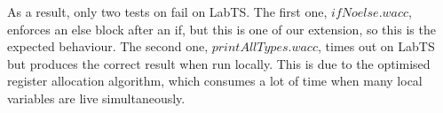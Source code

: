 \documentclass{article}
\begin{document}
As a result, only two tests on fail on LabTS. The first one, $ifNoelse.wacc$, enforces an else block after an if, but this
is one of our extension, so this is the expected behaviour. The second one, $printAllTypes.wacc$, times out on LabTS but
produces the correct result when run locally. This is due to the optimised register allocation algorithm, which consumes a
lot of time when many local variables are live simultaneously.
\end{document}
